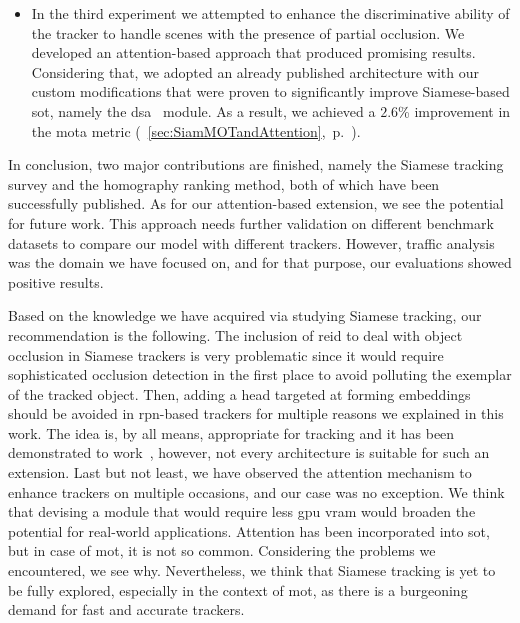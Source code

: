 \begin{enumerate}
\begin{itemize}
              \item In the third experiment we attempted to enhance the discriminative ability of the tracker to handle scenes with the presence of partial occlusion. We developed an attention-based approach that produced promising results. Considering that, we adopted an already published architecture with our custom modifications that were proven to significantly improve Siamese-based \gls{sot}, namely the \gls{dsa}~\cite{yu2021dsa} module. As a result, we achieved a $2.6$\% improvement in the \gls{mota} metric (\sectiontext{}~\ref{sec:SiamMOTandAttention},~p.~\pageref{sec:SiamMOTandAttention}).
          \end{itemize}
\end{enumerate}

In conclusion, two major contributions are finished, namely the Siamese tracking survey and the homography ranking method, both of which have been successfully published. As for our attention-based extension, we see the potential for future work. This approach needs further validation on different benchmark datasets to compare our model with different trackers. However, traffic analysis was the domain we have focused on, and for that purpose, our evaluations showed positive results.

Based on the knowledge we have acquired via studying Siamese tracking, our recommendation is the following. The inclusion of \gls{reid} to deal with object occlusion in Siamese trackers is very problematic since it would require sophisticated occlusion detection in the first place to avoid polluting the exemplar of the tracked object. Then, adding a head targeted at forming embeddings should be avoided in \gls{rpn}-based trackers for multiple reasons we explained in this work. The idea is, by all means, appropriate for tracking and it has been demonstrated to work~\cite{lu2020retinatrack, zhang2021fairmot}, however, not every architecture is suitable for such an extension. Last but not least, we have observed the attention mechanism to enhance trackers on multiple occasions, and our case was no exception. We think that devising a module that would require less \gls{gpu} \gls{vram} would broaden the potential for real-world applications. Attention has been incorporated into \gls{sot}, but in case of \gls{mot}, it is not so common. Considering the problems we encountered, we see why. Nevertheless, we think that Siamese tracking is yet to be fully explored, especially in the context of \gls{mot}, as there is a burgeoning demand for fast and accurate trackers.